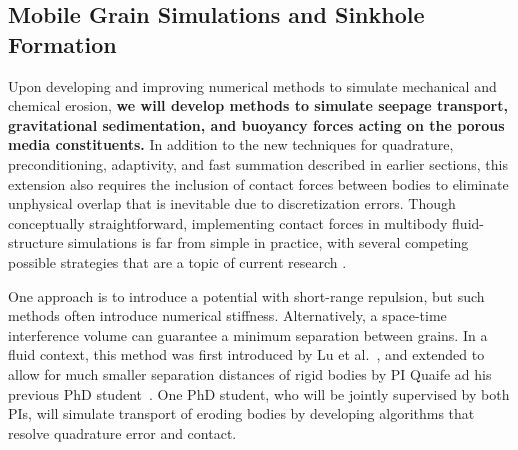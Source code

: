 \documentclass[11pt]{article}
\begin{document}

\subsection{Mobile Grain Simulations and Sinkhole Formation}
\label{sec:sinkhole}

Upon developing and improving numerical methods to simulate mechanical and chemical erosion, {\bf we will develop methods to simulate seepage transport, gravitational sedimentation, and buoyancy forces acting on the porous media constituents.} In addition to the new techniques for quadrature, preconditioning, adaptivity, and fast summation described in earlier sections, this extension also requires the inclusion of contact forces between bodies to eliminate unphysical overlap that is inevitable due to discretization errors. Though conceptually straightforward, implementing contact forces in multibody fluid-structure simulations is far from simple in practice, with several competing possible strategies that are a topic of current research \cite{yan2019computing, lu-rah-zor2017, bys-sha-qua2019, kab-qua-bir2018, vou-har-tam-gri2011}.

One approach is to introduce a potential with short-range repulsion, but such methods often introduce numerical stiffness. Alternatively, a space-time interference volume can guarantee a minimum separation between grains.  In a fluid context, this method was first introduced by Lu et al.~\cite{lu-rah-zor2017}, and extended to allow for much smaller separation distances of rigid bodies by PI Quaife ad his previous PhD student~\cite{bys-sha-qua2019}. One PhD student, who will be jointly supervised by both PIs, will simulate transport of eroding bodies by developing algorithms that resolve quadrature error and contact.  
\end{document}
